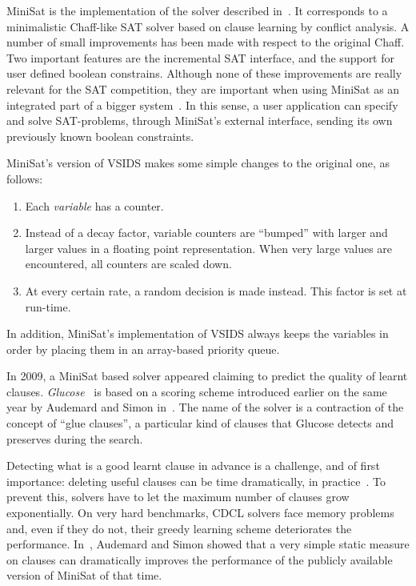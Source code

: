 MiniSat is the implementation of the solver described
in~\cite{een2003extensible}. It corresponds to a minimalistic Chaff-like SAT
solver based on clause learning by conflict analysis. A number of small
improvements has been made with respect to the original Chaff. Two important
features are the incremental SAT interface, and the support for user defined
boolean constrains. Although none of these improvements are really relevant for
the SAT competition, they are important when using MiniSat as an integrated part
of a bigger system~\cite{minisat}. In this sense, a user application can specify
and solve SAT-problems, through MiniSat's external interface, sending its own
previously known boolean constraints.

MiniSat's version of VSIDS makes some simple changes to the original one, as
follows:

\begin{enumerate}
    \item Each \emph{variable} has a counter.
    \item Instead of a decay factor, variable counters are ``bumped'' with
        larger and larger values in a floating point representation. When very
        large values are encountered, all counters are scaled down.
    \item At every certain rate, a random decision is made instead.
        This factor is set at run-time.
\end{enumerate}
In addition, MiniSat's implementation of VSIDS always keeps the variables in
order by placing them in an array-based priority queue.

In 2009, a MiniSat based solver appeared claiming to predict the quality of
learnt clauses. \emph{Glucose}~\cite{glucose} is based on a scoring scheme
introduced earlier on the same year by Audemard and Simon
in~\cite{audemard2009predicting}. The name of the solver is a contraction of the
concept of ``glue clauses'', a particular kind of clauses that Glucose detects
and preserves during the search.

Detecting what is a good learnt clause in advance is a challenge, and of first
importance: deleting useful clauses can be time dramatically, in
practice~\cite{glucose}. To prevent this, solvers have to let the maximum
number of clauses grow exponentially. On very hard benchmarks, CDCL solvers face
memory problems and, even if they do not, their greedy learning scheme
deteriorates the performance.  In~\cite{audemard2009predicting}, Audemard and
Simon showed that a very simple static measure on clauses can dramatically
improves the performance of the publicly available version of MiniSat of that
time.

